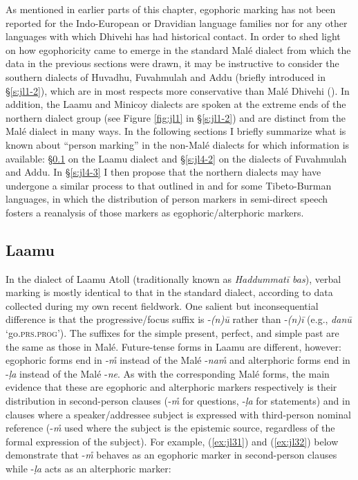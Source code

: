 \documentclass[output=paper]{langsci/langscibook}
\begin{document}
As mentioned in earlier parts of this chapter, egophoric marking has not been reported for the Indo-European or Dravidian language families nor for any other languages with which Dhivehi has had historical contact. In order to shed light on how egophoricity came to emerge in the standard Malé dialect from which the data in the previous sections were drawn, it may be instructive to consider the southern dialects of Huvadhu, Fuvahmulah and Addu (briefly introduced in §\ref{s:jl1-2}), which are in most respects more conservative than Malé Dhivehi (\citealt[13]{Fritz2002}). In addition, the Laamu and Minicoy dialects are spoken at the extreme ends of the northern dialect group (see Figure \ref{fig:jl1} in §\ref{s:jl1-2}) and are distinct from the Malé dialect in many ways. In the following sections I briefly summarize what is known about “person marking” in the non-Malé dialects for which information is available: §\ref{s:jl4-1} on the Laamu dialect and §\ref{s:jl4-2} on the dialects of Fuvahmulah and Addu. In §‎\ref{s:jl4-3} I then propose that the northern dialects may have undergone a similar process to that outlined in \cite{Widmer2015} and \cite{WidmerZemp2017} for some Tibeto-Burman languages, in which the distribution of person markers in semi-direct speech fosters a reanalysis of those markers as egophoric/alterphoric markers.

\subsection{Laamu}\label{s:jl4-1}

In the dialect of Laamu Atoll (traditionally known as \textit{Haddummatī bas}), verbal marking is mostly identical to that in the standard dialect, according to data collected during my own recent fieldwork. One salient but inconsequential difference is that the progressive/focus suffix is ‑\textit{(n)ū} rather than ‑\textit{(n)ī} (e.g., \textit{danū} ‘go.\textsc{prs}.\textsc{prog}’). The suffixes for the simple present, perfect, and simple past are the same as those in Malé. Future-tense forms in Laamu are different, however: egophoric forms end in ‑\textit{m̊} instead of the Malé -\textit{nam̊} and alterphoric forms end in -\textit{ḷa} instead of the Malé -\textit{ne}. As with the corresponding Malé forms, the main evidence that these are egophoric and alterphoric markers respectively is their distribution in second-person clauses (‑\textit{m̊} for questions, ‑\textit{ḷa} for statements) and in clauses where a speaker/addressee subject is expressed with third-person nominal reference (-\textit{m̊} used where the subject is the epistemic source, regardless of the formal expression of the subject). For example, (\ref{ex:jl31}) and (\ref{ex:jl32}) below demonstrate that -\textit{m̊} behaves as an egophoric marker in second-person clauses while -\textit{ḷa} acts as an alterphoric marker:
\end{document}
